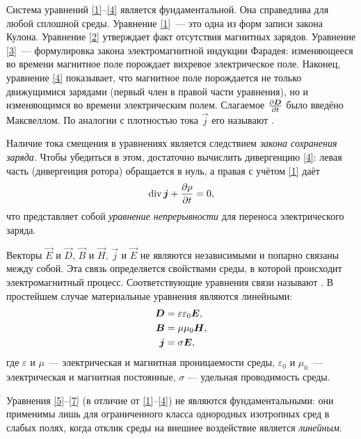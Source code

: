 Система уравнений \eqref{1}--\eqref{4} является фундаментальной. Она справедлива
для любой сплошной среды. Уравнение \eqref{1}~--- это одна из форм записи закона Кулона. 
Уравнение \eqref{2} утверждает факт отсутствия магнитных зарядов.
Уравнение \eqref{3}~--- формулировка закона электромагнитной индукции Фарадея: 
изменяющееся во времени магнитное поле порождает вихревое электрическое поле.
Наконец, уравнение \eqref{4} показывает, что магнитное поле порождается не только 
движущимися зарядами (первый член в правой части уравнения), но и изменяющимся 
во времени электрическим полем. Слагаемое $\frac{\partial {\boldsymbol{D}}}{\partial t}$ было введёно Максвеллом.
По аналогии с плотностью тока $\vec{j}$ его называют .

\begin{lab:note}
Наличие тока смещения в уравнениях является следствием \emph{закона сохранения заряда}.
Чтобы убедиться в этом, достаточно вычислить дивергенцию \eqref{4}:
левая часть (дивергенция ротора) обращается в нуль, а правая с учётом 
\eqref{1} даёт
\begin{equation}
\eqmark{cont}
\Div \vec{j} + \ddt{\rho} = 0,
\end{equation}
что представляет собой \emph{уравнение непрерывности} для переноса электрического заряда.
\end{lab:note}
 
Векторы $\vec{E}$ и $\vec{D}$, $\vec{B}$ и $\vec{H}$, $\vec{j}$ и $\vec{E}$ 
не являются независимыми и попарно связаны между собой. Эта связь 
определяется свойствами среды, в которой происходит электромагнитный процесс. 
Соответствующие уравнения связи называют .
В простейшем случае материальные уравнения являются линейными:
\begin{align}
\eqmark{5}
\vec{D}&=\varepsilon\varepsilon_0\vec{E},\\
\eqmark{6}
\vec{B}&=\mu\mu_0\vec{H},\\
\eqmark{7}
\vec{j}&=\sigma\vec{E},
\end{align}
где $\varepsilon$ и $\mu$~--- электрическая и магнитная проницаемости среды,
$\varepsilon_0$ и $\mu_0$~--- электрическая и магнитная постоянные,
$\sigma$ --- удельная проводимость среды.
\begin{lab:note}
Уравнения \eqref{5}--\eqref{7} (в отличие от \eqref{1}--\eqref{4})
не являются фундаментальными: они применимы лишь для ограниченного класса 
однородных изотропных сред в слабых полях, когда отклик среды на внешнее
воздействие является \emph{линейным}.
\end{lab:note}

